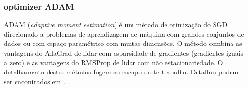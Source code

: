 \documentclass{automatextcc}
\begin{document}



\subsubsection{optimizer ADAM}
ADAM (\textit{adaptive moment estimation}) é um método de otimização do SGD direcionado a problemas de aprendizagem de máquina com grandes conjuntos de dados ou com espaço paramétrico com muitas dimensões. O método combina as vantagens do AdaGrad \citep{duchi2011} de lidar com esparsidade de gradientes (gradientes iguais a zero) e as vantagens do RMSProp \citep{tieleman2012} de lidar com não estacionariedade. O detalhamento destes métodos fogem ao escopo deste trabalho. Detalhes podem ser encontrados em \citet{kingma2014}.



\end{document}
